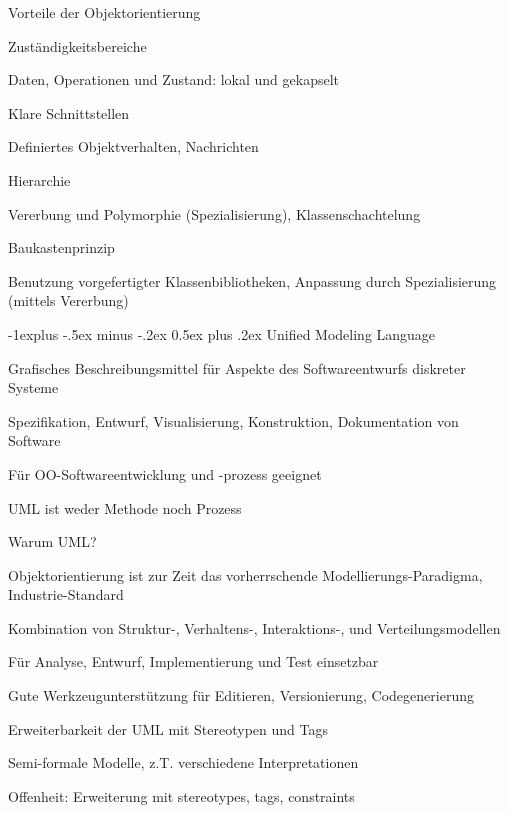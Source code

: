 \documentclass[a4paper]{article}
\makeatletter
\renewcommand{\subsection}{\@startsection{subsection}{2}{0mm}%
                                {-1explus -.5ex minus -.2ex}%
                                {0.5ex plus .2ex}%
                                {\normalfont\normalsize\bfseries}}
\makeatother
\begin{document}
\begin{multicols}{3}
  Vorteile der Objektorientierung
  \begin{itemize*}
    \item Zuständigkeitsbereiche
          \begin{itemize*}
            \item Daten, Operationen und Zustand: lokal und gekapselt
          \end{itemize*}
    \item Klare Schnittstellen
          \begin{itemize*}
            \item Definiertes Objektverhalten, Nachrichten
          \end{itemize*}
    \item Hierarchie
          \begin{itemize*}
            \item Vererbung und Polymorphie (Spezialisierung), Klassenschachtelung
          \end{itemize*}
    \item Baukastenprinzip
          \begin{itemize*}
            \item Benutzung vorgefertigter Klassenbibliotheken, Anpassung durch Spezialisierung (mittels Vererbung)
          \end{itemize*}
  \end{itemize*}


  \subsection{Unified Modeling Language}
  \begin{itemize*}
    \item Grafisches Beschreibungsmittel für Aspekte des Softwareentwurfs diskreter Systeme
    \item Spezifikation, Entwurf, Visualisierung, Konstruktion, Dokumentation von Software
    \item Für OO-Softwareentwicklung und -prozess geeignet
    \item UML ist weder Methode noch Prozess
  \end{itemize*}

  Warum UML?
  \begin{itemize*}
    \item Objektorientierung ist zur Zeit das vorherrschende Modellierungs-Paradigma, Industrie-Standard
    \item Kombination von Struktur-, Verhaltens-, Interaktions-, und Verteilungsmodellen
    \item Für Analyse, Entwurf, Implementierung und Test einsetzbar
    \item Gute Werkzeugunterstützung für Editieren, Versionierung, Codegenerierung
    \item Erweiterbarkeit der UML mit Stereotypen und Tags
    \item Semi-formale Modelle, z.T. verschiedene Interpretationen
    \item Offenheit: Erweiterung mit stereotypes, tags, constraints
  \end{itemize*}


\end{multicols}
\end{document}
